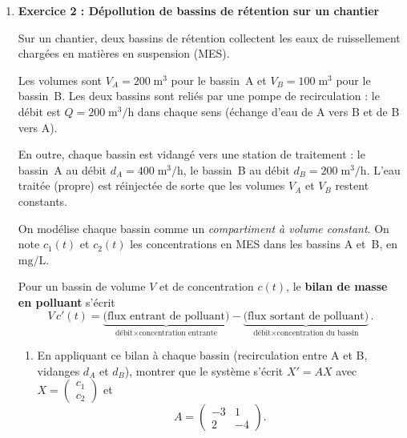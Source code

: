 \begin{enumerate}[itemsep=2em]
\newpage


\item \textbf{ Exercice 2 : Dépollution de bassins de rétention sur un chantier}

\medskip

Sur un chantier, deux bassins de rétention collectent les eaux de ruissellement chargées en matières en suspension (MES).

\medskip

Les volumes sont $V_A = 200\;\mathrm{m^3}$ pour le bassin~A et $V_B = 100\;\mathrm{m^3}$ pour le bassin~B. Les deux bassins sont reliés par une pompe de recirculation : le débit est $Q = 200\;\mathrm{m^3/h}$ dans chaque sens (échange d'eau de A vers B et de B vers A).

\medskip

En outre, chaque bassin est vidangé vers une station de traitement : \newline 
le bassin~A au débit $d_A = 400\;\mathrm{m^3/h}$, le bassin~B au débit $d_B = 200\;\mathrm{m^3/h}$. \newline
L'eau traitée (propre) est réinjectée de sorte que les volumes $V_A$ et $V_B$ restent constants.

\medskip

On modélise chaque bassin comme un \emph{compartiment à volume constant}. On note $c_1(t)$ et $c_2(t)$ les concentrations en MES dans les bassins A et~B, en~$\mathrm{mg/L}$.

\medskip

Pour un bassin de volume $V$ et de concentration $c(t)$, le \textbf{bilan de masse en polluant} s'écrit
\[
  V\,c'(t) = \underbrace{\text{(flux entrant de polluant)}}_{\text{débit} \times \text{concentration entrante}}
  - \underbrace{\text{(flux sortant de polluant)}}_{\text{débit} \times \text{concentration du bassin}}\,.
\]

\medskip
\begin{enumerate}[label=\alph*), itemsep=0.6em]
  \item En appliquant ce bilan à chaque bassin (recirculation entre A et B, vidanges $d_A$ et $d_B$), montrer que le système s'écrit $X' = AX$ avec $X = \begin{pmatrix} c_1 \\ c_2 \end{pmatrix}$ et
  \[
    A = \begin{pmatrix} -3 & 1 \\ 2 & -4 \end{pmatrix}.
  \]


\end{enumerate}
\end{enumerate}
